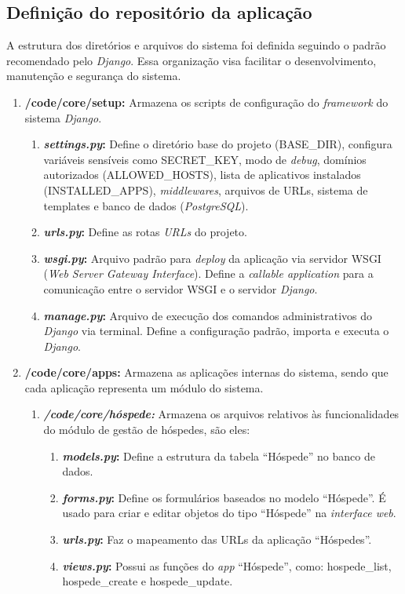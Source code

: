 \documentclass[
	12pt,				%
	openany,			%
	twoside,			%
	a4paper,			%
	english,			%
	french,				%
	spanish,			%
	brazil				%
	]{abntex2}
\begin{document}
\subsection{Definição do repositório da aplicação}A estrutura dos diretórios e arquivos do sistema foi definida  seguindo o padrão recomendado pelo \textit{Django}. Essa organização visa facilitar o desenvolvimento, manutenção e segurança do sistema.
%
\begin{enumerate}
	\item \textbf{/code/core/setup:} Armazena os scripts de configuração do \textit{framework} do sistema \textit{Django}.
	\begin{enumerate}
		\item \textbf{\textit{settings.py}:} Define o diretório base do projeto (BASE\_DIR), configura variáveis sensíveis como SECRET\_KEY, modo de \textit{debug}, domínios autorizados (ALLOWED\_HOSTS), lista de aplicativos instalados (INSTALLED\_APPS), \textit{middlewares}, arquivos de URLs, sistema de templates e banco de dados (\textit{PostgreSQL}).
		\item \textbf{\textit{urls.py}:} Define as rotas \textit{URLs} do projeto.
		\item \textbf{\textit{wsgi.py}:} Arquivo padrão para \textit{deploy} da aplicação via servidor WSGI (\textit{Web Server Gateway Interface}). Define a \textit{callable application} para a comunicação entre o servidor WSGI e o servidor \textit{Django}.
		\item \textbf{\textit{manage.py}:} Arquivo de execução dos comandos administrativos do \textit{Django} via terminal. Define a configuração padrão, importa e executa o \textit{Django}.
	\end{enumerate}
	
	\item \textbf{/code/core/apps:} Armazena as aplicações internas do sistema, sendo que cada aplicação representa um módulo do sistema.
	\begin{enumerate}
		\item \textbf{\textit{/code/core/hóspede:}} Armazena os arquivos relativos às funcionalidades do módulo de gestão de hóspedes, são eles:
		\begin{enumerate}
			\item \textbf{\textit{models.py}:} Define a estrutura da tabela “Hóspede” no banco de dados.
			\item \textbf{\textit{forms.py}:} Define os formulários baseados no modelo “Hóspede”. É usado para criar e editar objetos do tipo “Hóspede” na \textit{interface web}.
			\item \textbf{\textit{urls.py}:} Faz o mapeamento das URLs da aplicação “Hóspedes”.
			\item \textbf{\textit{views.py}:} Possui as funções do \textit{app} “Hóspede”, como: hospede\_list, hospede\_create e hospede\_update.
		\end{enumerate}
		

\end{enumerate}
\end{enumerate}
\end{document}
